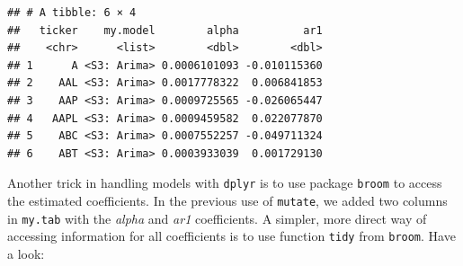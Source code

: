 \documentclass[11pt,]{book}
\newenvironment{Shaded}{\begin{snugshade}}{\end{snugshade}}
\newcommand{\KeywordTok}[1]{\textcolor[rgb]{0.27,0.27,0.27}{\textbf{#1}}}
\newcommand{\DataTypeTok}[1]{\textcolor[rgb]{0.27,0.27,0.27}{#1}}
\newcommand{\DecValTok}[1]{\textcolor[rgb]{0.06,0.06,0.06}{#1}}
\newcommand{\StringTok}[1]{\textcolor[rgb]{0.5,0.5,0.5}{#1}}
\newcommand{\CommentTok}[1]{\textcolor[rgb]{0.56,0.35,0.01}{\textit{#1}}}
\newcommand{\OperatorTok}[1]{\textcolor[rgb]{0.81,0.36,0.00}{\textbf{#1}}}
\newcommand{\NormalTok}[1]{#1}
\begin{document}
\begin{Shaded}
\end{Shaded}

\begin{verbatim}
## # A tibble: 6 × 4
##   ticker    my.model        alpha          ar1
##    <chr>      <list>        <dbl>        <dbl>
## 1      A <S3: Arima> 0.0006101093 -0.010115360
## 2    AAL <S3: Arima> 0.0017778322  0.006841853
## 3    AAP <S3: Arima> 0.0009725565 -0.026065447
## 4   AAPL <S3: Arima> 0.0009459582  0.022077870
## 5    ABC <S3: Arima> 0.0007552257 -0.049711324
## 6    ABT <S3: Arima> 0.0003933039  0.001729130
\end{verbatim}

Another trick in handling models with \texttt{dplyr} is to use package
\texttt{broom} \citep{broom} to access the estimated coefficients. In
the previous use of \texttt{mutate}, we added two columns in
\texttt{my.tab} with the \emph{alpha} and \emph{ar1} coefficients. A
simpler, more direct way of accessing information for all coefficients
is to use function \texttt{tidy} from \texttt{broom}. Have a look:
   

\begin{Shaded}
\end{Shaded}
\end{document}
